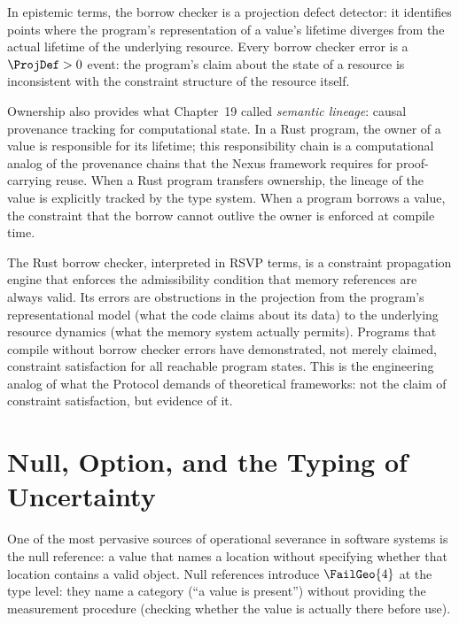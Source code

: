In epistemic terms, the borrow checker is a projection
defect detector: it identifies points where the program's
representation of a value's lifetime diverges from
the actual lifetime of the underlying resource. Every
borrow checker error is a $\ProjDef > 0$ event: the
program's claim about the state of a resource is
inconsistent with the constraint structure of the
resource itself.

Ownership also provides what Chapter~19 called
\emph{semantic lineage}: causal provenance tracking
for computational state. In a Rust program, the owner
of a value is responsible for its lifetime; this
responsibility chain is a computational analog of the
provenance chains that the Nexus framework requires
for proof-carrying reuse. When a Rust program transfers
ownership, the lineage of the value is explicitly
tracked by the type system. When a program borrows
a value, the constraint that the borrow cannot outlive
the owner is enforced at compile time.

\begin{salvage}
The Rust borrow checker, interpreted in RSVP terms,
is a constraint propagation engine that enforces
the admissibility condition that memory references
are always valid. Its errors are obstructions in
the projection from the program's representational
model (what the code claims about its data) to the
underlying resource dynamics (what the memory system
actually permits). Programs that compile without
borrow checker errors have demonstrated, not merely
claimed, constraint satisfaction for all reachable
program states. This is the engineering analog of
what the \Ortyx{} Protocol demands of theoretical
frameworks: not the claim of constraint satisfaction,
but evidence of it.
\end{salvage}

\section{Null, Option, and the Typing of Uncertainty}
\label{sec:null-option}

One of the most pervasive sources of operational
severance in software systems is the null reference:
a value that names a location without specifying whether
that location contains a valid object. Null references
introduce $\FailGeo{4}$ at the type level: they name
a category (``a value is present'') without providing
the measurement procedure (checking whether the value
is actually there before use).

